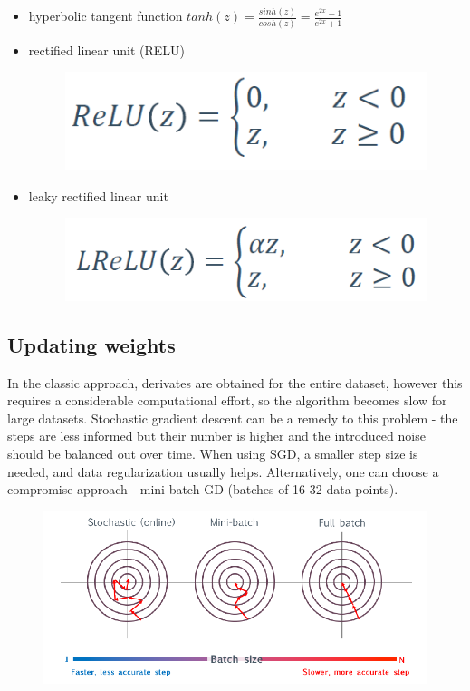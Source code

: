 \documentclass[11pt]{book}
\begin{document}
\begin{itemize}
\item hyperbolic tangent function $tanh(z) = \frac{sinh(z)}{cosh(z)} = \frac{e^{2x}-1}{e^{2x} + 1}$
\item rectified linear unit (RELU)

\begin{figure}[H]
    \centering
    \includegraphics[width=0.5\linewidth]{relu.PNG}

\end{figure}

\item leaky rectified linear unit 

\begin{figure}[H]
    \centering
    \includegraphics[width=0.5\linewidth]{lrelu.PNG}

\end{figure}


\end{itemize}

\subsection{Updating weights }

In the classic approach, derivates are obtained for the entire dataset, however this requires a considerable computational effort, so the algorithm becomes slow for large datasets. Stochastic gradient descent can be a remedy to this problem - the steps are less informed but their number is higher and the introduced noise should be balanced out over time. When using SGD, a smaller step size is needed, and data regularization usually helps. Alternatively, one can choose a compromise approach - mini-batch GD (batches of 16-32 data points).

\begin{figure}[H]
    \centering
    \includegraphics[width=0.75\linewidth]{NNGD.PNG}

\end{figure}
\end{document}

